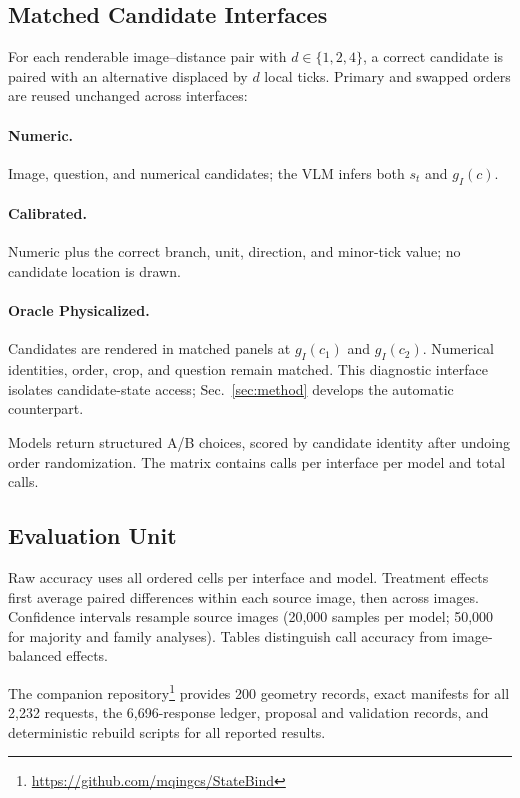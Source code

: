 \subsection{Matched Candidate Interfaces}
\label{sec:interfaces}

For each renderable image--distance pair with $d\in\{1,2,4\}$, a correct candidate is paired with an alternative displaced by $d$ local ticks. Primary and swapped orders are reused unchanged across interfaces:

\paragraph{Numeric.}
Image, question, and numerical candidates; the VLM infers both $s_t$ and $g_I(c)$.

\paragraph{Calibrated.}
Numeric plus the correct branch, unit, direction, and minor-tick value; no candidate location is drawn.

\paragraph{Oracle Physicalized.}
Candidates are rendered in matched panels at $g_I(c_1)$ and $g_I(c_2)$. Numerical identities, order, crop, and question remain matched. This diagnostic interface isolates candidate-state access; Sec.~\ref{sec:method} develops the automatic counterpart.

Models return structured A/B choices, scored by candidate identity after undoing order randomization. The matrix contains \CallsPerInterface{} calls per interface per model and \FormalCalls{} total calls.

\subsection{Evaluation Unit}

Raw accuracy uses all \CallsPerInterface{} ordered cells per interface and model. Treatment effects first average paired differences within each source image, then across images. Confidence intervals resample source images (20,000 samples per model; 50,000 for majority and family analyses). Tables distinguish call accuracy from image-balanced effects.

The companion repository\footnote{\url{https://github.com/mqingcs/StateBind}}
provides 200 geometry records, exact manifests for all 2,232 requests,
the 6,696-response ledger, proposal and validation records,
and deterministic rebuild scripts for all reported results.
